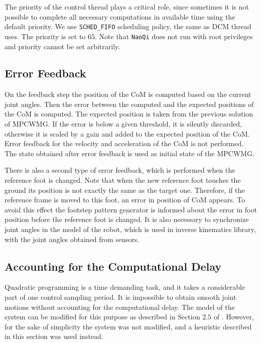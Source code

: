 The priority of the control thread plays a critical role, since sometimes it is not 
possible to complete all necessary computations in available time using the default 
priority. We use \verb|SCHED_FIFO| scheduling policy, the same as \ac{DCM} thread 
uses. The priority is set to $65$. Note that \verb|NaoQi| does not run with root 
privileges and priority cannot be set arbitrarily. 


\subsection{Error Feedback}\label{sec.err_feedback}
On the feedback step the position of the \ac{CoM} is computed based on the current
joint angles. Then the error between the computed and the expected positions of
the \ac{CoM} is computed. The expected position is taken from the previous solution
of \ac{MPCWMG}. If the error is below a given threshold, it is silently discarded,
otherwise it is scaled by a gain and added to the expected position of the \ac{CoM}. 
Error feedback for the velocity and acceleration of the \ac{CoM} is not performed. 
The state obtained after error feedback is used as initial state of the \ac{MPCWMG}.

There is also a second type of error feedback, which is performed when the reference
foot is changed. Note that when the new reference foot touches the ground its position
is not exactly the same as the target one. Therefore, if the reference frame is
moved to this foot, an error in position of \ac{CoM} appears. To avoid this effect the
footstep pattern generator is informed about the error in foot position before the
reference foot is changed. It is also necessary to synchronize joint angles in the 
model of the robot, which is used in inverse kinematics library, with the joint angles 
obtained from sensors.


\subsection{Accounting for the Computational Delay}\label{sec.mpc_delay}
Quadratic programming is a time demanding task, and it takes a considerable part of 
one control sampling period. It is impossible to obtain smooth joint motions without 
accounting for the computational delay. The model of the system can be modified for 
this purpose as described in Section $2.5$ of \cite{MacMPC}. However, for the sake 
of simplicity the system was not modified, and a heuristic described in this section 
was used instead.

